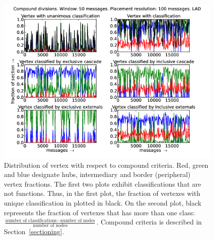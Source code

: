 \documentclass[%
 aip,
 jmp,%
 amsmath,amssymb,
 reprint,%
]{revtex4-1}
\begin{document}
\begin{figure}[hbtp] 
   \centering
        \includegraphics[width=\textwidth]{figs/LAD/50_2}
    \caption{Distribution of vertex with respect to compound criteria. Red, green and blue designate hubs, intermediary and border (peripheral) vertex fractions. The first two plots exhibit classifications that are not functions. Thus, in the first plot, the fraction of vertexes with unique classification in plotted in black. On the second plot, black represents the fraction of vertexes that has more than one class: $\frac{\text{number of classifications} - \text{number of nodes}}{\text{number of nodes}}$. Compound criteria is described in Section~\ref{sectioning}.}
    \label{fig:lad50_}
\end{figure}





%
%




\nocite{*}
\end{document}

